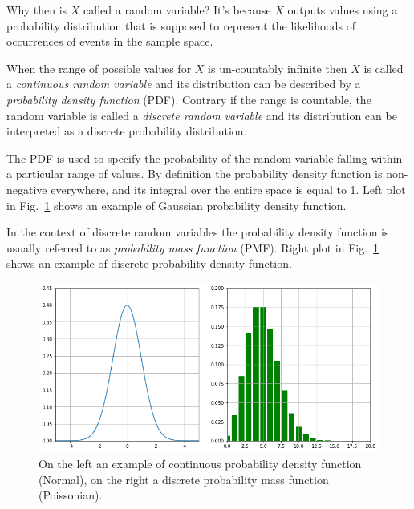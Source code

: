 
Why then is $X$ called a random variable? It’s because $X$ outputs values using a probability distribution that is supposed to represent the likelihoods of occurrences of events in the sample space. 


When the range of possible values for $X$ is un-countably infinite then $X$ is called a \emph{continuous random variable} and its distribution can be described by a \emph{probability density function} (PDF). Contrary if the range is countable, the random variable is called a \emph{discrete random variable} and its distribution can be interpreted as a discrete probability distribution.

The PDF is used to specify the probability of the random variable falling within a particular range of values. By definition 
the probability density function is non-negative everywhere, and its integral over the entire space is equal to 1.
Left plot in Fig.~\ref{fig:pdf_pmf} shows an example of Gaussian probability density function.

In the context of discrete random variables the probability density function is usually referred to as \emph{probability mass function} (PMF). Right plot in Fig.~\ref{fig:pdf_pmf} shows an example of discrete probability density function.

\begin{figure}[htb]
	\centering
	\includegraphics[width=1.\textwidth]{figures/pdf_pmf.png}
	\caption{On the left an example of continuous probability density function (Normal), on the right a discrete probability mass function (Poissonian).}
	\label{fig:pdf_pmf}
\end{figure}

